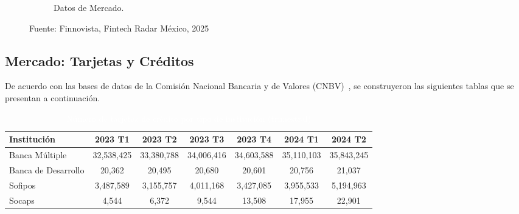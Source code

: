 \begin{figure}[h!]
\begin{subfigure}[b]{0.45\textwidth}
        \caption{Datos de Mercado.}
        \label{fig:datmerca}
    \end{subfigure}
    \caption{Fuente: Finnovista,  Fintech Radar México, 2025}
    \label{fig:figure1}
\end{figure}


\subsection*{Mercado: Tarjetas y Créditos}
De acuerdo con las bases de datos de la Comisión Nacional Bancaria y de Valores (CNBV)~\cite{cnbv_inclusion_2024}, se construyeron las siguientes tablas que se presentan a continuación.

\begin{table}[h!]
    \centering
    \caption{\textcolor{white}{Número de tarjetas de crédito por tipo de institución (trimestral)}}
    \color{white}
    \begin{tabular}{lcccccc}
        \hline
        \textbf{Institución} & \textbf{2023 T1} & \textbf{2023 T2} & \textbf{2023 T3} & \textbf{2023 T4} & \textbf{2024 T1} & \textbf{2024 T2} \\
        \hline
        Banca Múltiple       &        32,538,425         &        33,380,788         &       34,006,416          &       34,603,588          &        35,110,103         &        35,843,245    \\
        Banca de Desarrollo  &       20,362         &          20,495       &        20,680         &         20,601        &        20,756         &        21,037        \\
        Sofipos              &     3,487,589         &         3,155,757        &        4,011,168         &        3,427,085         &        3,955,533         &        5,194,963      \\
        Socaps               &       4,544          &           6,372      &       9,544          &         13,508        &        17,955         &            22,901     \\
        \hline
    \end{tabular}
    \label{tab:creditos_trimestrales}
\end{table}

